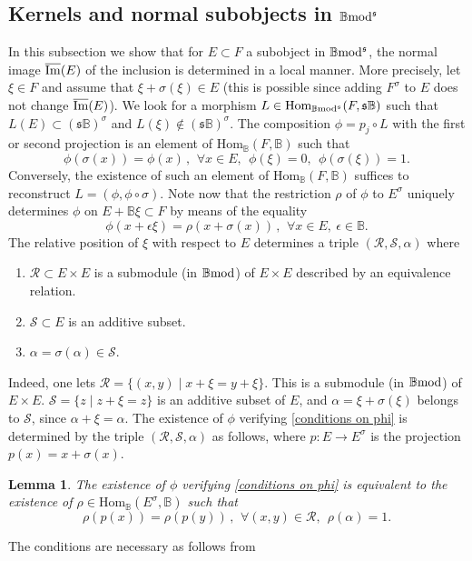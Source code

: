 \documentclass[12pt]{article}
\newtheorem{lem}[thm]{Lemma}
\def\Hom{{\rm Hom}}
\def\B{{\mathbb B}}
\def\imm{\overline{\rm Im}}
\def\cR{{\mathcal R}}
\def\cS{{\mathcal S}}
\def\qqq{\,,\,~\forall}
\def\Hom {{\mbox{Hom}}}
\def\yb{\mathfrak{s}}
\def\bmod{{\rm \B mod}}
\def\b2{{\rm \B mod^{\mathfrak s}}}
\begin{document}
\subsection{Kernels and normal subobjects in $\b2$}\label{sectkerb2}
In this subsection we show that for $E\subset F$ a subobject in $\b2$, the normal image $\imm(E)$ of the inclusion is determined in a local manner. More precisely, let $\xi\in F$ and assume that $\xi+\sigma(\xi)\in E$ (this is possible since adding $F^\sigma$ to $E$ does not change $\imm(E)$).  We look for a morphism $L\in \Hom_\b2(F,\yb\B)$ such that $L(E)\subset (\yb\B)^\sigma$ and $L(\xi)\notin (\yb\B)^\sigma$. The composition $\phi=p_j\circ L$ with the first or second projection is an element of $\Hom_\B(F,\B)$ such that 
 \begin{equation}\label{conditions on phi}
 \phi(\sigma(x))=\phi(x)\qqq x\in E, \ \  \phi(\xi)=0, \  \ \phi(\sigma(\xi))=1.
 \end{equation}
 Conversely, the existence of such an element of $\Hom_\B(F,\B)$ suffices to reconstruct $L=(\phi,\phi\circ\sigma)$. Note now that the restriction $\rho$ of $\phi$ to $E^\sigma$ uniquely determines $\phi$ on $E+\B\xi\subset F$ by means of the equality
 $$
 \phi(x+\epsilon \xi)=\rho(x+\sigma(x))\qqq x\in E,  \ \epsilon \in \B.
 $$
 The relative position of $\xi$ with respect to $E$ determines a triple $(\cR,\cS,\alpha)$ where 
 \begin{enumerate}
 \item $\cR\subset E\times E$ is a submodule (in $\bmod$) of $E\times E$ described by an equivalence relation.
 \item	$\cS\subset E$ is an additive subset.
 \item $\alpha=\sigma(\alpha)\in \cS$.
 \end{enumerate}
 Indeed, one lets $\cR=\{(x,y)\mid x+\xi=y+\xi\}$. This is a submodule (in $\bmod$) of $E\times E$. $\cS=\{z\mid z+\xi=z\}$  is an additive subset of $E$, and $\alpha=\xi+\sigma(\xi)$ belongs to $\cS$, since $\alpha+\xi=\alpha$. The existence of $\phi$ verifying \eqref{conditions on phi} is determined by the triple  $(\cR,\cS,\alpha)$ as follows, where $p:E\to E^\sigma$ is the projection $p(x)=x+\sigma(x)$.
  \begin{lem}\label{existphi} The existence of $\phi$ verifying \eqref{conditions on phi} is
  equivalent to the existence of $\rho\in \Hom_\B(E^\sigma,\B)$ such that 
  $$
  \rho(p(x))=\rho(p(y))\qqq (x,y)\in \cR, \ \ \rho(\alpha)=1.
  $$  
    \end{lem}
\proof The conditions are necessary as follows from 
\end{document}
